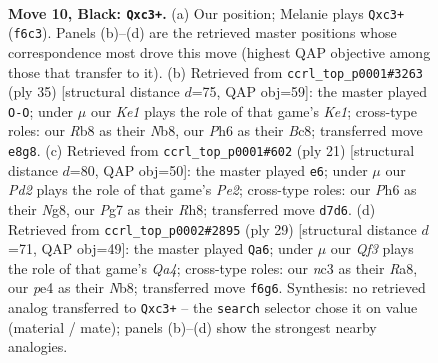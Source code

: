 \documentclass[11pt]{article}
\begin{document}
\begin{figure}[p]\centering
\begin{subfigure}{0.46\textwidth}\centering
\resizebox{\linewidth}{!}{%
\newchessgame
\chessboard[
  setfen={1rb1k2r/p1pp1pp1/2p2q1p/8/4P3/P1N5/P1P2PPP/R1Q1KB1R b KQk - 0 10},
  showmover=false,
  pgfstyle=straightmove, color=movearrow, markmove={f6-c3}
]}
\caption{}
\end{subfigure}\hfill
\begin{subfigure}{0.46\textwidth}\centering
\resizebox{\linewidth}{!}{%
\newchessgame
\chessboard[
  setfen={1nb1k2r/1p2pp1p/3p1qp1/8/1PP5/4PN2/1R1Q1PPP/r2B1RK1 b k - 1 18},
  showmover=false,
  pgfstyle=straightmove, color=movearrow, markmove={e8-g8}
]}
\caption{}
\end{subfigure}
\\[4pt]
\begin{subfigure}{0.46\textwidth}\centering
\resizebox{\linewidth}{!}{%
\newchessgame
\chessboard[
  setfen={r3kbnr/p3pppp/2p5/q3P3/3Q4/2N2P2/PP3P1P/R1B1K2R b KQkq - 0 11},
  showmover=false,
  pgfstyle=straightmove, color=movearrow, markmove={e7-e6}
]}
\caption{}
\end{subfigure}\hfill
\begin{subfigure}{0.46\textwidth}\centering
\resizebox{\linewidth}{!}{%
\newchessgame
\chessboard[
  setfen={rnb1r1k1/p4pp1/1p2p2p/q7/2PPQ2B/P1P5/4NPPP/2R1K2R b K - 0 15},
  showmover=false,
  pgfstyle=straightmove, color=movearrow, markmove={a5-a6}
]}
\caption{}
\end{subfigure}
\caption{\textbf{Move 10, Black: \texttt{Qxc3+}.} (a) Our position; Melanie plays \texttt{Qxc3+} (\texttt{f6c3}). Panels (b)--(d) are the retrieved master positions whose correspondence most drove this move (highest QAP objective among those that transfer to it). (b) Retrieved from \texttt{ccrl\_top\_p0001\#3263} (ply 35) [structural distance $d$=75, QAP obj=59]: the master played \texttt{O-O}; under $\mu$ our \emph{Ke1} plays the role of that game's \emph{Ke1}; cross-type roles: our \emph{R}b8 as their \emph{N}b8, our \emph{P}h6 as their \emph{B}c8; transferred move \texttt{e8g8}. (c) Retrieved from \texttt{ccrl\_top\_p0001\#602} (ply 21) [structural distance $d$=80, QAP obj=50]: the master played \texttt{e6}; under $\mu$ our \emph{Pd2} plays the role of that game's \emph{Pe2}; cross-type roles: our \emph{P}h6 as their \emph{N}g8, our \emph{P}g7 as their \emph{R}h8; transferred move \texttt{d7d6}. (d) Retrieved from \texttt{ccrl\_top\_p0002\#2895} (ply 29) [structural distance $d$=71, QAP obj=49]: the master played \texttt{Qa6}; under $\mu$ our \emph{Qf3} plays the role of that game's \emph{Qa4}; cross-type roles: our \emph{n}c3 as their \emph{R}a8, our \emph{p}e4 as their \emph{N}b8; transferred move \texttt{f6g6}. Synthesis: no retrieved analog transferred to \texttt{Qxc3+} -- the \texttt{search} selector chose it on value (material / mate); panels (b)--(d) show the strongest nearby analogies.}
\label{fig:thought-m19}
\end{figure}
\end{document}

